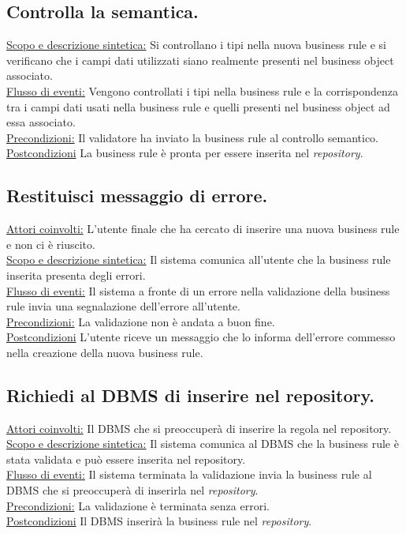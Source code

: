 \documentclass[11pt,titlepage,a4paper]{report}
\begin{document}
\subsection{Controlla la semantica.}
\underline{Scopo e descrizione sintetica:} Si controllano i tipi nella nuova business rule e si verificano che i campi dati utilizzati siano realmente presenti nel business object associato.\\
\underline{Flusso di eventi:} Vengono controllati i tipi nella business rule e la corrispondenza tra i campi dati usati nella business rule e quelli presenti nel business object ad essa associato.\\
\underline{Precondizioni:} Il validatore ha inviato la business rule al controllo semantico.\\
\underline{Postcondizioni} La business rule \`e pronta per essere inserita nel \textit{repository}.

\subsection{Restituisci messaggio di errore.}
\underline{Attori coinvolti:} L'utente finale che ha cercato di inserire una nuova business rule e non ci \`e riuscito.\\
\underline{Scopo e descrizione sintetica:} Il sistema comunica all'utente che la business rule inserita presenta degli errori.\\
\underline{Flusso di eventi:} Il sistema  a fronte di un errore nella validazione della business rule invia una segnalazione dell'errore all'utente.\\
\underline{Precondizioni:} La validazione non \`e andata a buon fine.\\
\underline{Postcondizioni} L'utente riceve un messaggio che lo informa dell'errore commesso nella creazione della nuova business rule.

\subsection{Richiedi al DBMS di inserire nel repository.}
\underline{Attori coinvolti:} Il DBMS che si preoccuper\`a di inserire la regola nel repository.\\
\underline{Scopo e descrizione sintetica:} Il sistema comunica al DBMS che la business rule \`e stata validata e pu\`o essere inserita nel repository.\\
\underline{Flusso di eventi:} Il sistema  terminata la validazione invia la business rule al DBMS che si preoccuper\`a di inserirla nel \textit{repository}.\\
\underline{Precondizioni:} La validazione \`e terminata senza errori.\\
\underline{Postcondizioni} Il DBMS inserir\`a la business rule nel \textit{repository}.
\end{document}

